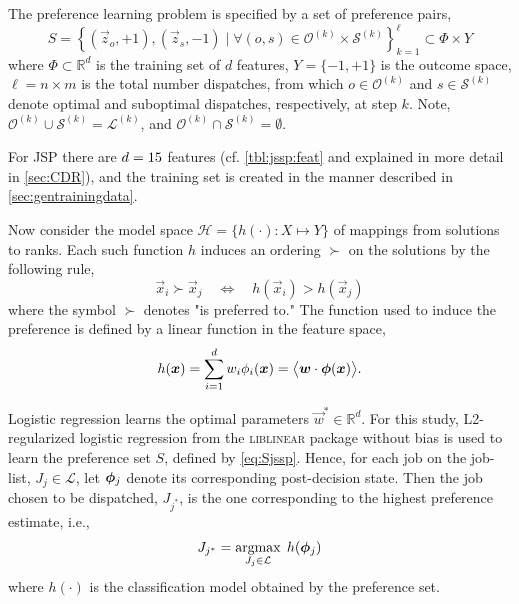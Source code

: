 \documentclass[smallextended]{svjour3}
\begin{document}
The preference learning problem is specified by a set of preference pairs,
\begin{equation}
	S = 
	\left\{\left(\vec{z}_o,+1\right),\left(\vec{z}_s,-1\right)
	\;|\;\forall (o,s) \in \mathcal{O}^{(k)} \times \mathcal{S}^{(k)}
	\right\}_{k=1}^{\ell} \subset \Phi\times Y \label{eq:Sjssp}
\end{equation}
where $\Phi\subset \mathbb{R}^d$ is the training set of $d$ features,  
$Y=\{-1,+1\}$ is the outcome space, $\ell=n\times m$ is the total number 
dispatches, from which $o\in\mathcal{O}^{(k)}$ and $s\in \mathcal{S}^{(k)}$ 
denote optimal and suboptimal dispatches, respectively, at step $k$. 
Note, $\mathcal{O}^{(k)}\cup\mathcal{S}^{(k)}=\mathcal{L}^{(k)}$, and 
$\mathcal{O}^{(k)}\cap\mathcal{S}^{(k)}=\emptyset$. 

For JSP there are $d=15$ features (cf. \cref{tbl:jssp:feat} and 
explained in more detail in \cref{sec:CDR}), and the training set is created in 
the manner described in \cref{sec:gentrainingdata}.

Now consider the model space $\mathcal{H} = \{h(\cdot) : X \mapsto Y\}$ of 
mappings from solutions to ranks. Each such function $h$ induces an ordering 
$\succ$ on the solutions  by the following rule,
\begin{equation}\label{eq:linear}
	\vec{x}_i \succ \vec{x}_j \quad \Leftrightarrow \quad h(\vec{x}_i) > 
	h(\vec{x}_j)
\end{equation}
where the symbol $\succ$ denotes "is preferred to."  The function used to 
induce the preference is defined by a linear function in the feature space,
\begin{equation}\label{eq:jssp:linweights}
	h(\vec{x})=\sum_{i=1}^d w_i\phi_i(\vec{x})=\inner{\vec{w}}{\vphi(\vec{x})}.
\end{equation}

Logistic regression learns the optimal parameters $\vec{w}^*\in\mathbb{R}^d$. 
For this study, L2-regularized logistic regression from the \textsc{liblinear} 
package \cite{liblinear} without bias is used to learn the preference set $S$, 
defined by \eqref{eq:Sjssp}.
Hence, for each job on the job-list, $J_j\in\mathcal{L}$, let $\bm{\phi}_j$ denote 
its corresponding  post-decision state. Then the job chosen to be dispatched, 
$J_{j^*}$, is the one corresponding to the highest preference estimate, i.e.,
\begin{equation}\label{eq:lin}
	J_{j^*}=\mathop{\rm argmax}_{J_j\in \mathcal{L}}\; h(\bm{\phi}_j)
\end{equation}
where $h(\cdot)$ is the classification model obtained by the preference set.
\end{document}
